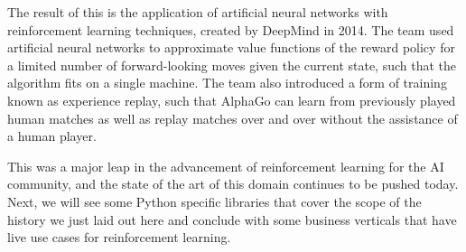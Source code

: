 \documentclass[a4paper,10pt]{extarticle}
\begin{document}
\begin{multicols}{2}
            The result of this is the application of artificial neural networks with reinforcement learning techniques, created by DeepMind in 2014. The team used artificial neural networks to approximate value functions of the reward policy for a limited number of forward-looking moves given the current state, such that the algorithm fits on a single machine. The team also introduced a form of training known as experience replay, such that AlphaGo can learn from previously played human matches as well as replay matches over and over without the assistance of a human player. 

            This was a major leap in the advancement of reinforcement learning for the AI community, and the state of the art of this domain continues to be pushed today. Next, we will see some Python specific libraries that cover the scope of the history we just laid out here and conclude with some business verticals that have live use cases for reinforcement learning. 

            \smallskip

            \end{multicols}
\end{document}
